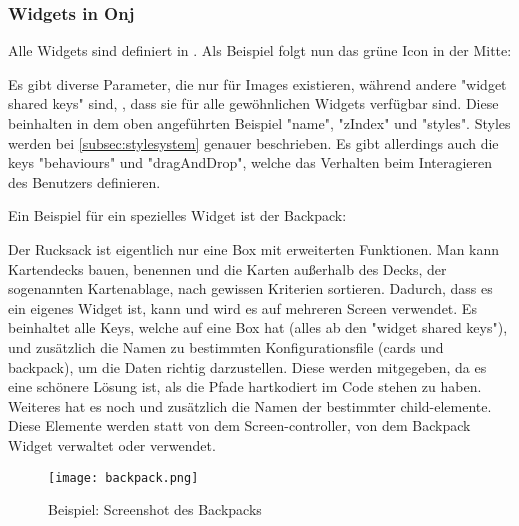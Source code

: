 \subsubsection{Widgets in Onj}\label{subsubsec:widgetsinonj}
\renewcommand{\kapitelautor}{Autor: Felix Zwickelstorfer}
Alle Widgets sind definiert in .
Als Beispiel folgt nun das grüne Icon in der Mitte:
Es gibt diverse Parameter, die nur für Images existieren, während andere "widget shared keys" sind, \dah, dass sie für alle gewöhnlichen Widgets verfügbar sind.
Diese beinhalten in dem oben angeführten Beispiel "name", "zIndex" und "styles".
Styles werden bei \ref{subsec:stylesystem} genauer beschrieben.
Es gibt allerdings auch die keys "behaviours" und "dragAndDrop", welche das Verhalten beim Interagieren des Benutzers definieren.

Ein Beispiel für ein spezielles Widget ist der Backpack:
Der Rucksack ist eigentlich nur eine Box mit erweiterten Funktionen.
Man kann Kartendecks bauen, benennen und die Karten außerhalb des Decks, der sogenannten Kartenablage, nach gewissen Kriterien sortieren.
Dadurch, dass es ein eigenes Widget ist, kann und wird es auf mehreren Screen verwendet.
Es beinhaltet alle Keys, welche auf eine Box hat (alles ab den "widget shared keys"), und zusätzlich die Namen zu bestimmten Konfigurationsfile (cards und backpack), um die Daten richtig darzustellen.
Diese werden mitgegeben, da es eine schönere Lösung ist, als die Pfade hartkodiert im Code stehen zu haben.
Weiteres hat es noch und zusätzlich die Namen der bestimmter child-elemente.
Diese Elemente werden statt von dem Screen-controller, von dem Backpack Widget verwaltet oder verwendet.
\begin{figure}[H]
    \centering
    \texttt{[image: backpack.png]}
    \caption{Beispiel: Screenshot des Backpacks}
\end{figure}
\renewcommand{\kapitelautor}{Autor: Felix Zwickelstorfer}
